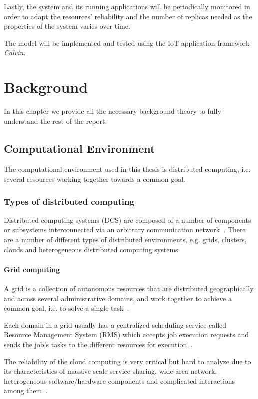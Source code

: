 \documentclass{cslthse-msc}
\begin{document}
Lastly, the system and its running applications will be periodically monitored in order to adapt the resources' reliability and the number of replicas needed as the properties of the system varies over time.

The model will be implemented and tested using the IoT application framework \emph{Calvin}.

\chapter{Background} \label{ch:background}
In this chapter we provide all the necessary background theory to fully understand the rest of the report.
\section{Computational Environment} \label{sec:background_comp_env}
The computational environment used in this thesis is distributed computing, i.e. several resources working together towards a common goal.

\subsection{Types of distributed computing} \label{subsec:background_types_of_distr_comp}
Distributed computing systems (DCS) are composed of a number of components or subsystems interconnected via an arbitrary communication network~\cite{relModelDistSimSystem, efficientRelAnalysisAlgo}. There are a number of different types of distributed environments, e.g. grids, clusters, clouds and heterogeneous distributed computing systems.

\subsubsection{Grid computing}
A grid is a collection of autonomous resources that are distributed geographically and across several administrative domains, and work together to achieve a common goal, i.e. to solve a single task~\cite{compStudyLoadAndCloud, relAndPerfGridServices, evalOfGridRel}.

Each domain in a grid usually has a centralized scheduling service called Resource Management System (RMS) which accepts job execution requests and sends the job's tasks to the different resources for execution~\cite{evalOfGridRel}.

The reliability of the cloud computing is very critical but hard to analyze due to its characteristics of massive-scale service sharing, wide-area network, heterogeneous software/hardware components and complicated interactions among them~\cite{cloudServiceRel}.
\end{document}
